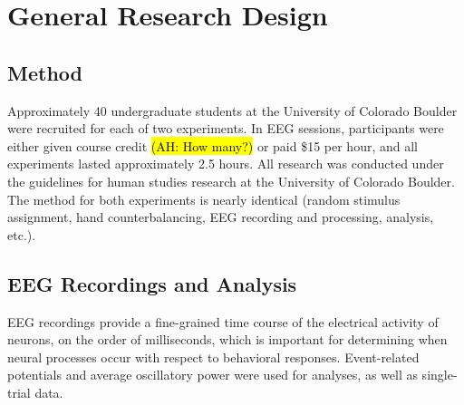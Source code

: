 
\section{General Research Design}

\subsection{Method}



Approximately 40 undergraduate students at the University of Colorado Boulder were recruited for each of two experiments.  In EEG sessions, participants were either given course credit \hl{(AH: How many?)} or paid \$15 per hour, and all experiments lasted approximately 2.5 hours.  All research was conducted under the guidelines for human studies research at the University of Colorado Boulder.  The method for both experiments is nearly identical (random stimulus assignment, hand counterbalancing, EEG recording and processing, analysis, etc.).


\subsection{EEG Recordings and Analysis}

EEG recordings provide a fine-grained time course of the electrical
activity of neurons, on the order of milliseconds, which is important
for determining when neural processes occur with respect to behavioral
responses.  Event-related potentials and average oscillatory power were used for analyses, as well as single-trial data.

